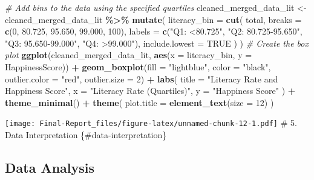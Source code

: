 \documentclass[
]{article}
\newenvironment{Shaded}{\begin{snugshade}}{\end{snugshade}}
\newcommand{\AttributeTok}[1]{\textcolor[rgb]{0.13,0.29,0.53}{#1}}
\newcommand{\CommentTok}[1]{\textcolor[rgb]{0.56,0.35,0.01}{\textit{#1}}}
\newcommand{\ConstantTok}[1]{\textcolor[rgb]{0.56,0.35,0.01}{#1}}
\newcommand{\DecValTok}[1]{\textcolor[rgb]{0.00,0.00,0.81}{#1}}
\newcommand{\FloatTok}[1]{\textcolor[rgb]{0.00,0.00,0.81}{#1}}
\newcommand{\FunctionTok}[1]{\textcolor[rgb]{0.13,0.29,0.53}{\textbf{#1}}}
\newcommand{\NormalTok}[1]{#1}
\newcommand{\OtherTok}[1]{\textcolor[rgb]{0.56,0.35,0.01}{#1}}
\newcommand{\SpecialCharTok}[1]{\textcolor[rgb]{0.81,0.36,0.00}{\textbf{#1}}}
\newcommand{\StringTok}[1]{\textcolor[rgb]{0.31,0.60,0.02}{#1}}
\begin{document}
\begin{Shaded}
\begin{Highlighting}[]
\CommentTok{\# Add bins to the data using the specified quartiles}
\NormalTok{cleaned\_merged\_data\_lit }\OtherTok{\textless{}{-}}\NormalTok{ cleaned\_merged\_data\_lit }\SpecialCharTok{\%\textgreater{}\%}
  \FunctionTok{mutate}\NormalTok{(}
    \AttributeTok{literacy\_bin =} \FunctionTok{cut}\NormalTok{(}
\NormalTok{      total,}
      \AttributeTok{breaks =} \FunctionTok{c}\NormalTok{(}\DecValTok{0}\NormalTok{, }\FloatTok{80.725}\NormalTok{, }\FloatTok{95.650}\NormalTok{, }\FloatTok{99.000}\NormalTok{, }\DecValTok{100}\NormalTok{), }
      \AttributeTok{labels =} \FunctionTok{c}\NormalTok{(}\StringTok{"Q1: \textless{}80.725"}\NormalTok{, }
                 \StringTok{"Q2: 80.725{-}95.650"}\NormalTok{, }
                 \StringTok{"Q3: 95.650{-}99.000"}\NormalTok{, }
                 \StringTok{"Q4: \textgreater{}99.000"}\NormalTok{),}
      \AttributeTok{include.lowest =} \ConstantTok{TRUE}
\NormalTok{    )}
\NormalTok{  )}
\CommentTok{\# Create the box plot}
\FunctionTok{ggplot}\NormalTok{(cleaned\_merged\_data\_lit, }\FunctionTok{aes}\NormalTok{(}\AttributeTok{x =}\NormalTok{ literacy\_bin, }\AttributeTok{y =}\NormalTok{ HappinessScore)) }\SpecialCharTok{+}
  \FunctionTok{geom\_boxplot}\NormalTok{(}\AttributeTok{fill =} \StringTok{"lightblue"}\NormalTok{, }\AttributeTok{color =} \StringTok{"black"}\NormalTok{, }\AttributeTok{outlier.color =} \StringTok{"red"}\NormalTok{, }\AttributeTok{outlier.size =} \DecValTok{2}\NormalTok{) }\SpecialCharTok{+}
  \FunctionTok{labs}\NormalTok{(}
    \AttributeTok{title =} \StringTok{"Literacy Rate and Happiness Score"}\NormalTok{,}
    \AttributeTok{x =} \StringTok{"Literacy Rate (Quartiles)"}\NormalTok{,}
    \AttributeTok{y =} \StringTok{"Happiness Score"}
\NormalTok{  ) }\SpecialCharTok{+}
  \FunctionTok{theme\_minimal}\NormalTok{() }\SpecialCharTok{+} 
  \FunctionTok{theme}\NormalTok{(}
    \AttributeTok{plot.title =} \FunctionTok{element\_text}\NormalTok{(}\AttributeTok{size =} \DecValTok{12}\NormalTok{) }
\NormalTok{  )}
\end{Highlighting}
\end{Shaded}

\texttt{[image: Final-Report\_files/figure-latex/unnamed-chunk-12-1.pdf]}
\# 5. Data Interpretation \{\#data-interpretation\}

\subsection{Data Analysis}\label{data-analysis}
\end{document}
